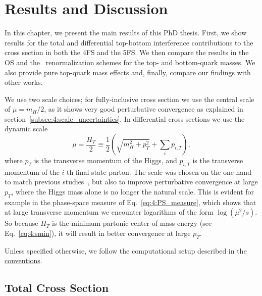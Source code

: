
\chapter{Results and Discussion}\label{chap:six}

In this chapter, we present the main results of this PhD thesis. First, we show results for the total and differential top-bottom interference contributions to the cross section in both the 4\acs{FS} and the 5\acs{FS}. We then compare the results in the \acs{OS} and the \MS\ renormalization schemes for the top- and bottom-quark masses. We also provide pure top-quark mass effects and, finally, compare our findings with other works.

We use two scale choices; for fully-inclusive cross section we use the central scale of $\mu = m_H/2$, as it shows very good perturbative convergence as explained in section~\ref{subsec:4:scale_uncertainties}. In differential cross sections we use the dynamic scale
\begin{equation}
\mu = \frac{H_T}{2} \equiv \frac{1}{2} \left( \sqrt{m_H^2 + p_T^2} + \sum_i p_{i, T} \right),
\label{eq:6:mu_dynamic}
\end{equation}
where $p_T$ is the transverse momentum of the Higgs, and $p_{i, T}$ is the transverse momentum of the $i$-th final state parton. The scale was chosen on the one hand to match previous studies~\cite{Lindert:2017pky, Bonciani:2022jmb, Jones:2018hbb}, but also to improve perturbative convergence at large $p_T$, where the Higgs mass alone is no longer the natural scale. This is evident for example in the phase-space measure of Eq.~\eqref{eq:4:PS_measure}, which shows that at large transverse momentum we encounter logarithms of the form $\log (\mu^2/s)$. So because $H_T$ is the minimum partonic center of mass energy (see Eq.~\eqref{eq:4:smin}), it will result in better convergence at large $p_T$.

Unless specified otherwise, we follow the computational setup described in the \hyperref[chap:notation_and_conventions]{conventions}.

\section{Total Cross Section}
